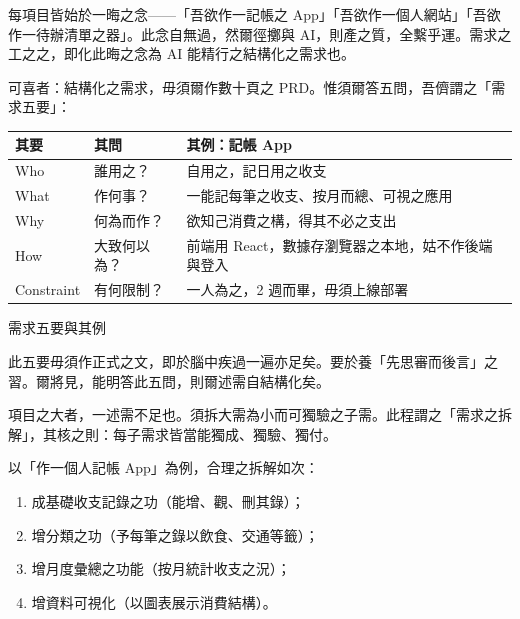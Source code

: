 


每項目皆始於一晦之念——「吾欲作一記帳之 App」「吾欲作一個人網站」「吾欲作一待辦清單之器」。此念自無過，然爾徑擲與 AI，則產之質，全繫乎運。需求之工之之，即化此晦之念為 AI 能精行之結構化之需求也。

可喜者：結構化之需求，毋須爾作數十頁之 PRD。惟須爾答五問，吾儕謂之「需求五要」：

\begin{center}
\begin{tabularx}{\linewidth}{|X|X|X|}
\hline
\textbf{其要} & \textbf{其問} & \textbf{其例：記帳 App} \tabularnewline
\hline
Who & 誰用之？ & 自用之，記日用之收支 \tabularnewline
What & 作何事？ & 一能記每筆之收支、按月而總、可視之應用 \tabularnewline
Why & 何為而作？ & 欲知己消費之構，得其不必之支出 \tabularnewline
How & 大致何以為？ & 前端用 React，數據存瀏覽器之本地，姑不作後端與登入 \tabularnewline
Constraint & 有何限制？ & 一人為之，2 週而畢，毋須上線部署 \tabularnewline
\hline
\end{tabularx}
\end{center}

\begin{center}\small\color{gray}需求五要與其例\end{center}

此五要毋須作正式之文，即於腦中疾過一遍亦足矣。要於養「先思審而後言」之習。爾將見，能明答此五問，則爾述需自結構化矣。


項目之大者，一述需不足也。須拆大需為小而可獨驗之子需。此程謂之「需求之拆解」，其核之則：每子需求皆當能獨成、獨驗、獨付。

以「作一個人記帳 App」為例，合理之拆解如次：

\begin{enumerate}
  \item 成基礎收支記錄之功（能增、觀、刪其錄）；
  \item 增分類之功（予每筆之錄以飲食、交通等籤）；
  \item 增月度彙總之功能（按月統計收支之況）；
  \item 增資料可視化（以圖表展示消費結構）。
\end{enumerate}

